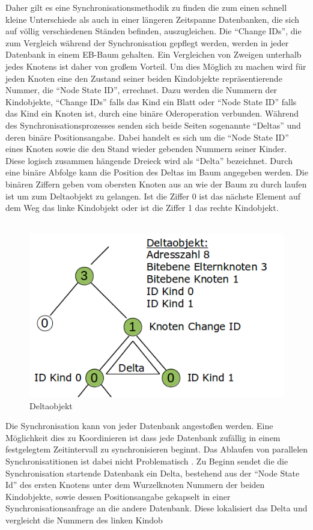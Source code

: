 \documentclass[a4paper,11pt,oneside,%
headsepline,												%
footsepline,												%
bibtotocnumbered									%
]{scrreprt}
\begin{document}
Daher gilt es eine Synchronisationsmethodik zu finden die zum einen schnell kleine Unterschiede als auch in einer längeren Zeitspanne Datenbanken, die sich auf völlig verschiedenen Ständen befinden, auszugleichen.
Die \enquote{Change IDs}, die zum Vergleich während der Synchronisation gepflegt werden, werden in jeder Datenbank in einem \ac{EB-Baum} gehalten. Ein Vergleichen von Zweigen unterhalb jedes Knotens ist daher von großem Vorteil. Um dies Möglich zu machen wird für jeden Knoten eine den Zustand seiner beiden Kindobjekte repräsentierende Nummer, die \enquote{Node State ID}, errechnet. Dazu werden die Nummern der Kindobjekte, \enquote{Change IDs} falls das Kind ein Blatt oder \enquote{Node State ID} falls das Kind ein Knoten ist, durch eine binäre Oderoperation verbunden. Während des Synchronisationsprozesses senden sich beide Seiten sogenannte \enquote{Deltas} und deren binäre Positionsangabe. Dabei handelt es sich um die \enquote{Node State ID} eines Knoten sowie die den Stand wieder gebenden Nummern seiner Kinder. Diese logisch zusammen hängende Dreieck wird als \enquote{Delta} bezeichnet. Durch eine binäre Abfolge kann die Position des Deltas im Baum angegeben werden. Die binären Ziffern geben vom obersten Knoten aus an wie der Baum zu durch laufen ist um zum Deltaobjekt zu gelangen. Ist die Ziffer 0  ist das nächste Element auf dem Weg das linke Kindobjekt oder ist die Ziffer 1 das rechte Kindobjekt. \\\\
\begin{figure}
  \begin{center}
    \includegraphics[width=.6\linewidth]{bilder/SynchroDelta.png}
  \end{center}
 \caption{Deltaobjekt}
\end{figure}
Die Synchronisation kann von jeder Datenbank angestoßen werden. Eine Möglichkeit dies zu Koordinieren ist dass jede Datenbank zufällig in einem festgelegtem Zeitintervall zu synchronisieren beginnt. Das Ablaufen von parallelen Synchronisatitionen ist dabei nicht Problematisch . Zu Beginn sendet die die Synchronisation startende Datenbank ein Delta, bestehend aus der \enquote{Node State Id} des ersten Knotens unter dem Wurzelknoten Nummern der beiden Kindobjekte, sowie dessen Positionsangabe  gekapselt in einer Synchronisationsanfrage an die andere Datenbank. Diese lokalisiert das Delta und vergleicht die Nummern des linken Kindob
\end{document}
